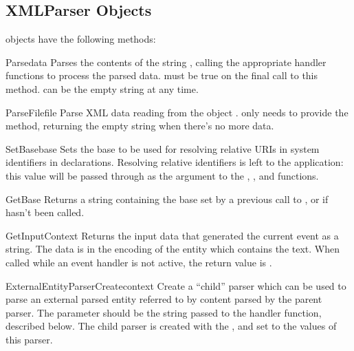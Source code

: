 \subsection{XMLParser Objects \label{xmlparser-objects}}

 objects have the following methods:

\begin{methoddesc}[xmlparser]{Parse}{data}
Parses the contents of the string , calling the appropriate
handler functions to process the parsed data.   must be
true on the final call to this method.   can be the empty
string at any time.
\end{methoddesc}

\begin{methoddesc}[xmlparser]{ParseFile}{file}
Parse XML data reading from the object .   only
needs to provide the  method, returning the
empty string when there's no more data.
\end{methoddesc}

\begin{methoddesc}[xmlparser]{SetBase}{base}
Sets the base to be used for resolving relative URIs in system
identifiers in declarations.  Resolving relative identifiers is left
to the application: this value will be passed through as the
 argument to the ,
, and
 functions.
\end{methoddesc}

\begin{methoddesc}[xmlparser]{GetBase}{}
Returns a string containing the base set by a previous call to
, or  if 
 hasn't been called.
\end{methoddesc}

\begin{methoddesc}[xmlparser]{GetInputContext}{}
Returns the input data that generated the current event as a string.
The data is in the encoding of the entity which contains the text.
When called while an event handler is not active, the return value is
.
\end{methoddesc}

\begin{methoddesc}[xmlparser]{ExternalEntityParserCreate}{context}
Create a ``child'' parser which can be used to parse an external
parsed entity referred to by content parsed by the parent parser.  The
 parameter should be the string passed to the
 handler function, described below.
The child parser is created with the ,
 and  set to the
values of this parser.
\end{methoddesc}


